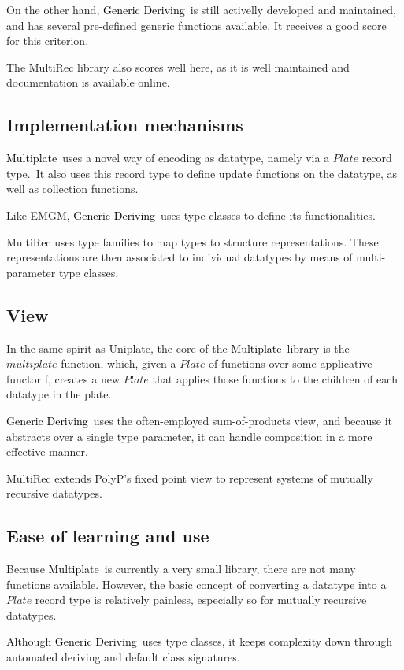 \documentclass[twocolumn,11pt,a4paper]{article}
\newcommand{\multiplate}{\textcolor{black}{Multiplate}}
\newcommand{\genericderiving}{\textcolor{black}{Generic Deriving}}
\begin{document}
On the other hand, \genericderiving\ is still activelly developed and maintained, and has several pre-defined generic functions available.
It receives a good score for this criterion.

The MultiRec library also scores well here, as it is well maintained and documentation is available online.

\subsection{Implementation mechanisms}
\multiplate\ uses a novel way of encoding as datatype, namely via a $ Plate $ record type.\
It also uses this record type to define update functions on the datatype, as well as collection functions.

Like EMGM, \genericderiving\ uses type classes to define its functionalities.

MultiRec uses type families to map types to structure representations.
These representations are then associated to individual datatypes by means of multi-parameter type classes.

\subsection{View}
In the same spirit as Uniplate, the core of the \multiplate\ library is the $ multiplate $ function, which, given a $ Plate $ of functions over some applicative functor f, creates a new $ Plate $ that applies those functions to the children of each datatype in the plate.

\genericderiving\ uses the often-employed sum-of-products view, and because it abstracts over a single type parameter, it can handle composition in a more effective manner.

MultiRec extends PolyP's fixed point view to represent systems of mutually recursive datatypes.

\subsection{Ease of learning and use}
Because \multiplate\ is currently a very small library, there are not many functions available.
However, the basic concept of converting a datatype into a $ Plate $ record type is relatively painless, especially so for mutually recursive datatypes.

Although \genericderiving\ uses type classes, it keeps complexity down through automated deriving and default class signatures.
\end{document}
